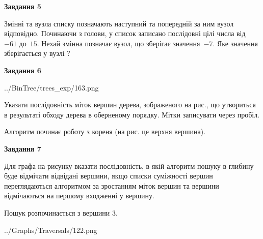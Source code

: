 \documentclass[12pt, ukrainian]{article}
\begin{document}
{\begin {large}
{\begin {center}\textbf{Завдання 5}\end {center}}\par
Змінні  та  вузла списку позначають наступний та попередній за ним вузол відповідно. Починаючи з голови, у список записано послідовні цілі числа від~$-61$ до~$15$. Нехай змінна  позначає вузол, що зберігає значення~$-7$.
Яке значення зберігається у вузлі  ?\par
\newpage

{\begin {center}\textbf{Завдання 6}\end {center}}\par

\begin{center}
	{../BinTree/trees_exp/163.png}
\end{center}
Указати послідовність міток вершин дерева, зображеного на рис., що утвориться в результаті обходу дерева в оберненому порядку. Мітки записувати через пробіл.\par Алгоритм починає роботу з кореня (на рис. це верхня вершина).\par
\newpage

{\begin {center}\textbf{Завдання 7}\end {center}}\par
Для графа на рисунку вказати послідовність, в якій алгоритм пошуку в глибину буде відмічати відвідані вершини, якщо списки суміжності вершин переглядаються алгоритмом за зростанням міток вершин та вершини відмічаються на першому вход\-женні у вершину.\par
Пошук розпочинається з вершини 3.\par

\begin{center}
	{../Graphs/Traversals/122.png}
\end{center}\par
\newpage


\end{large}}
\end{document}
